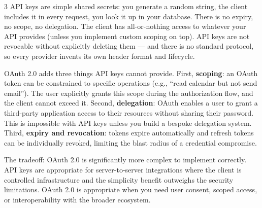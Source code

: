 \documentclass[11pt,a4paper]{article}
\begin{document}
\begin{answerbox}{3}
API keys are simple shared secrets: you generate a random string, the client includes it in every request, you look it up in your database. There is no expiry, no scope, no delegation. The client has all-or-nothing access to whatever your API provides (unless you implement custom scoping on top). API keys are not revocable without explicitly deleting them --- and there is no standard protocol, so every provider invents its own header format and lifecycle.

OAuth 2.0 adds three things API keys cannot provide. First, \textbf{scoping}: an OAuth token can be constrained to specific operations (e.g., ``read calendar but not send email''). The user explicitly grants this scope during the authorization flow, and the client cannot exceed it. Second, \textbf{delegation}: OAuth enables a user to grant a third-party application access to their resources without sharing their password. This is impossible with API keys unless you build a bespoke delegation system. Third, \textbf{expiry and revocation}: tokens expire automatically and refresh tokens can be individually revoked, limiting the blast radius of a credential compromise.

The tradeoff: OAuth 2.0 is significantly more complex to implement correctly. API keys are appropriate for server-to-server integrations where the client is controlled infrastructure and the simplicity benefit outweighs the security limitations. OAuth 2.0 is appropriate when you need user consent, scoped access, or interoperability with the broader ecosystem.
\end{answerbox}

\vspace{0.4cm}
\end{document}
